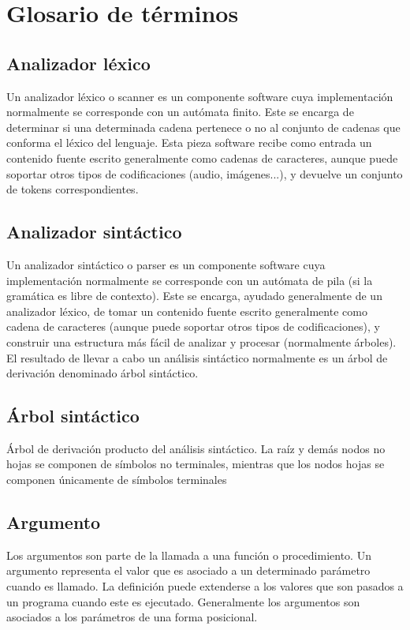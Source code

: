 \section{Glosario de términos}



\subsection {Analizador léxico}
Un analizador léxico o scanner es un componente software cuya implementación normalmente se corresponde con un autómata finito. Este se encarga de determinar si una determinada cadena pertenece o no al conjunto de cadenas 
que conforma el léxico del lenguaje. Esta pieza software recibe como entrada un contenido fuente escrito generalmente como cadenas de caracteres, aunque puede soportar otros tipos de codificaciones
(audio, imágenes...), y devuelve un conjunto de tokens correspondientes. \\

\subsection {Analizador sintáctico}
Un analizador sintáctico o parser es un componente software cuya implementación normalmente se corresponde con un autómata de pila (si la gramática es libre de contexto). Este se encarga, ayudado generalmente de un analizador léxico,
de tomar un contenido fuente escrito generalmente como cadena de caracteres (aunque puede soportar otros tipos de codificaciones), y construir una estructura más fácil de analizar y procesar 
(normalmente árboles). El resultado de llevar a cabo un análisis sintáctico normalmente es un árbol de derivación denominado árbol sintáctico. \\

\subsection {Árbol sintáctico}
Árbol de derivación producto del análisis sintáctico. La raíz y demás nodos no hojas se componen de símbolos no terminales, mientras que los nodos hojas se componen únicamente de símbolos
terminales\\

\subsection {Argumento}
Los argumentos son parte de la llamada a una función o procedimiento. Un argumento representa el valor que es asociado a un determinado parámetro cuando es llamado. La definición puede extenderse a los valores que son pasados
a un programa cuando este es ejecutado. Generalmente los argumentos son asociados a los parámetros de una forma posicional.\\

